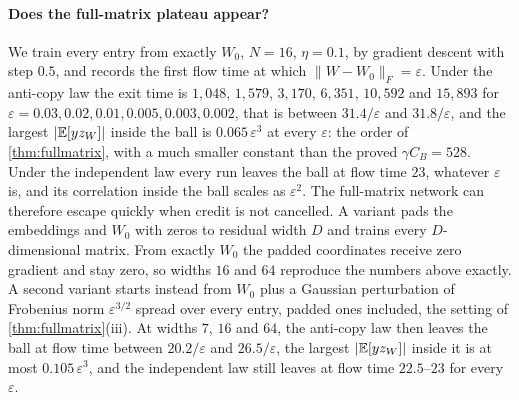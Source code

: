 \paragraph{Does the full-matrix plateau appear?}
We train every entry from exactly $W_0$, $N=16$, $\eta=0.1$, by gradient descent with step $0.5$, and records the first flow time at which
$\|W-W_0\|_F=\varepsilon$. Under the anti-copy law the exit time is $1{,}048$, $1{,}579$, $3{,}170$, $6{,}351$, $10{,}592$ and $15{,}893$ for
$\varepsilon=0.03,0.02,0.01,0.005,0.003,0.002$, that is between $31.4/\varepsilon$ and $31.8/\varepsilon$, and the largest $|\mathbb E[yz_W]|$ inside the ball is $0.065\,\varepsilon^3$ at every $\varepsilon$:
the order of \cref{thm:fullmatrix}, with a much smaller constant than the proved $\gamma C_B=528$. Under the independent law every run leaves the ball at flow time $23$,
whatever $\varepsilon$ is, and its correlation inside the ball scales as $\varepsilon^2$. The full-matrix network can therefore escape quickly when credit is not cancelled.
A variant pads the embeddings and $W_0$ with zeros to residual width $D$ and trains every $D$-dimensional matrix.
From exactly $W_0$ the padded coordinates receive zero gradient and stay zero, so widths $16$ and $64$ reproduce the numbers above exactly.
A second variant starts instead from $W_0$ plus a Gaussian perturbation of Frobenius norm $\varepsilon^{3/2}$ spread over every entry, padded ones included,
the setting of \cref{thm:fullmatrix}(iii). At widths $7$, $16$ and $64$, the anti-copy law then leaves the ball at flow time between $20.2/\varepsilon$ and $26.5/\varepsilon$,
the largest $|\mathbb E[yz_W]|$ inside it is at most $0.105\,\varepsilon^3$, and the independent law still leaves at flow time $22.5$--$23$ for every $\varepsilon$.

